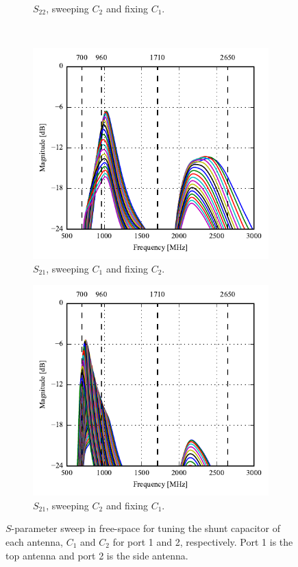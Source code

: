 \begin{figure}[htbp]
\begin{subfigure}[b]{0.49\linewidth}
        \caption{$S_{22}$, sweeping $C_2$ and fixing $C_1$.}
    \end{subfigure}
~
    \begin{subfigure}[b]{0.49\linewidth}
        \centering
        \includegraphics{img/tech_sol/monopole/5mm/sim/sweep_s11_s21}
        \caption{$S_{21}$, sweeping $C_1$ and fixing $C_2$.}
    \end{subfigure}
    \hfill
    \begin{subfigure}[b]{0.49\linewidth}
        \centering
        \includegraphics{img/tech_sol/monopole/5mm/sim/sweep_s22_s21_12p}
        \caption{$S_{21}$, sweeping $C_2$ and fixing $C_1$.}
    \end{subfigure}
    \caption{$S$-parameter sweep in free-space for tuning the shunt capacitor of each antenna, $C_1$ and $C_2$ for port 1 and 2, respectively. Port 1 is the top antenna and port 2 is the side antenna.}
    \label{fig:sparam_mono_6pf_free_space}
\end{figure}

